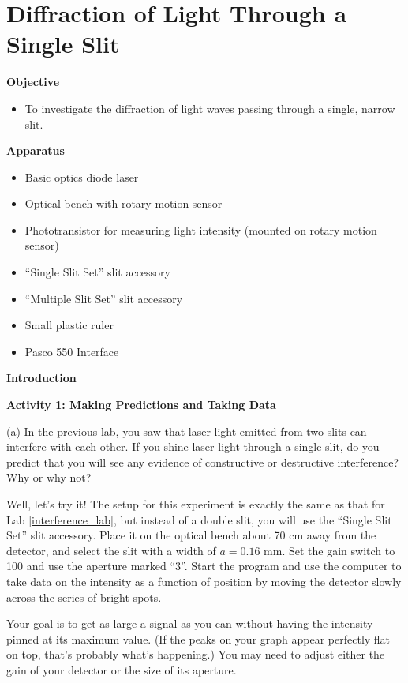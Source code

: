 
\section{Diffraction of Light Through a Single Slit}

\makelabheader %

\textbf{Objective}

\begin{itemize}
\item To investigate the diffraction of light waves passing through
a single, narrow slit. 
\end{itemize}
\textbf{Apparatus}

\begin{itemize}
\item Basic optics diode laser
\item Optical bench with rotary motion sensor
\item Phototransistor for measuring light intensity (mounted on rotary motion sensor)
\item ``Single Slit Set'' slit accessory
\item ``Multiple Slit Set'' slit accessory
\item Small plastic ruler
\item Pasco 550 Interface
\end{itemize}
\textbf{Introduction}

\textbf{Activity 1: Making Predictions and Taking Data}

(a) In the previous lab, you saw that laser light emitted from two slits can interfere with each other.  If you shine laser light through a single slit, do you predict that you will see any evidence of constructive or destructive interference?  Why or why not?
\answerspace{0.8in}


Well, let's try it!  The setup for this experiment is exactly the same as that for Lab \ref{interference_lab},  but instead of a double slit, you will use the ``Single Slit Set'' slit accessory.  Place it on the optical bench about 70 cm away from the detector, and select the slit with a width of $a = 0.16$ mm.   Set the gain switch to 100 and use the aperture marked ``3''.   Start the program  and use the computer to take data on the intensity as a function of position by moving the detector slowly across the series of bright spots.  

Your goal is to get as large a signal as you can without having the intensity pinned at its maximum value.  (If the peaks on your graph appear perfectly flat on top, that's probably what's happening.) You may need to adjust either the gain of your detector or the size of its aperture.

